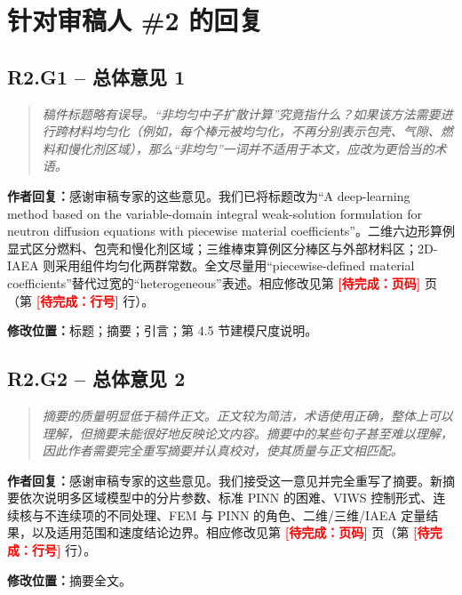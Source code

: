 \documentclass[11pt,a4paper]{article}
\newenvironment{reviewercomment}{\begin{quote}\small\itshape\color{commentgray}}{\end{quote}}
\newcommand{\authorresponse}{\noindent\textbf{作者回复：}\quad}
\newcommand{\revisionlocation}[1]{\par\noindent\textcolor{locationblue}{\textbf{修改位置：}}#1}
\newcommand{\draftplaceholder}[1]{\textcolor{red}{\textbf{[待完成：#1]}}}
\begin{document}
\section*{针对审稿人 \#2 的回复}

\subsection*{R2.G1 -- 总体意见 1}
\begin{reviewercomment}
稿件标题略有误导。“非均匀中子扩散计算”究竟指什么？如果该方法需要进行跨材料均匀化（例如，每个棒元被均匀化，不再分别表示包壳、气隙、燃料和慢化剂区域），那么“非均匀”一词并不适用于本文，应改为更恰当的术语。
\end{reviewercomment}
\authorresponse 感谢审稿专家的这些意见。我们已将标题改为“A deep-learning method based on the variable-domain integral weak-solution formulation for neutron diffusion equations with piecewise material coefficients”。二维六边形算例显式区分燃料、包壳和慢化剂区域；三维棒束算例区分棒区与外部材料区；2D-IAEA 则采用组件均匀化两群常数。全文尽量用“piecewise-defined material coefficients”替代过宽的“heterogeneous”表述。相应修改见第 \draftplaceholder{页码} 页（第 \draftplaceholder{行号} 行）。
\revisionlocation{标题；摘要；引言；第 4.5 节建模尺度说明。}

\subsection*{R2.G2 -- 总体意见 2}
\begin{reviewercomment}
摘要的质量明显低于稿件正文。正文较为简洁，术语使用正确，整体上可以理解，但摘要未能很好地反映论文内容。摘要中的某些句子甚至难以理解，因此作者需要完全重写摘要并认真校对，使其质量与正文相匹配。
\end{reviewercomment}
\authorresponse 感谢审稿专家的这些意见。我们接受这一意见并完全重写了摘要。新摘要依次说明多区域模型中的分片参数、标准 PINN 的困难、VIWS 控制形式、连续核与不连续项的不同处理、FEM 与 PINN 的角色、二维/三维/IAEA 定量结果，以及适用范围和速度结论边界。相应修改见第 \draftplaceholder{页码} 页（第 \draftplaceholder{行号} 行）。
\revisionlocation{摘要全文。}
\end{document}
